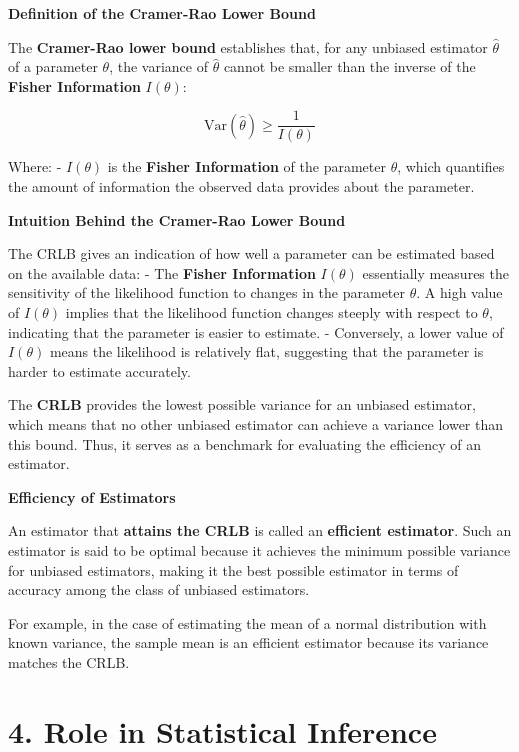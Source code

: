 \documentclass[
  12 pt,
  a4paper,
]{book}
\numberwithin{equation}{section}
\theoremstyle{plain}      %
\theoremstyle{definition} %
\theoremstyle{remark}     %
\theoremstyle{note}         %
\begin{document}
\textbf{Definition of the Cramer-Rao Lower Bound}

The \textbf{Cramer-Rao lower bound} establishes that, for any unbiased
estimator \(\hat{\theta}\) of a parameter \(\theta\), the variance of
\(\hat{\theta}\) cannot be smaller than the inverse of the
\textbf{Fisher Information} \(I(\theta)\):

\[
\text{Var}(\hat{\theta}) \geq \frac{1}{I(\theta)}
\]

Where: - \(I(\theta)\) is the \textbf{Fisher Information} of the
parameter \(\theta\), which quantifies the amount of information the
observed data provides about the parameter.

\textbf{Intuition Behind the Cramer-Rao Lower Bound}

The CRLB gives an indication of how well a parameter can be estimated
based on the available data: - The \textbf{Fisher Information}
\(I(\theta)\) essentially measures the sensitivity of the likelihood
function to changes in the parameter \(\theta\). A high value of
\(I(\theta)\) implies that the likelihood function changes steeply with
respect to \(\theta\), indicating that the parameter is easier to
estimate. - Conversely, a lower value of \(I(\theta)\) means the
likelihood is relatively flat, suggesting that the parameter is harder
to estimate accurately.

The \textbf{CRLB} provides the lowest possible variance for an unbiased
estimator, which means that no other unbiased estimator can achieve a
variance lower than this bound. Thus, it serves as a benchmark for
evaluating the efficiency of an estimator.

\textbf{Efficiency of Estimators}

An estimator that \textbf{attains the CRLB} is called an
\textbf{efficient estimator}. Such an estimator is said to be optimal
because it achieves the minimum possible variance for unbiased
estimators, making it the best possible estimator in terms of accuracy
among the class of unbiased estimators.

For example, in the case of estimating the mean of a normal distribution
with known variance, the sample mean is an efficient estimator because
its variance matches the CRLB.

\hypertarget{role-in-statistical-inference}{%
\section{4. Role in Statistical
Inference}\label{role-in-statistical-inference}}
\end{document}
